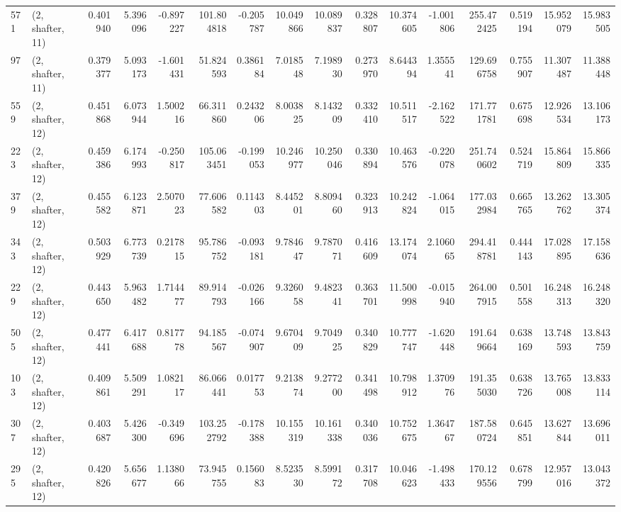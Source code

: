 \begin{tabular}{llrrrrrrrrrrrrrr}
571 &  (2, shafter, 11) &   0.401940 &   5.396096 &  -0.897227 &   101.804818 &  -0.205787 &  10.049866 &  10.089837 &  0.328807 &  10.374605 &  -1.001806 &    255.472425 &   0.519194 &   15.952079 &   15.983505 \\
97  &  (2, shafter, 11) &   0.379377 &   5.093173 &  -1.601431 &    51.824593 &   0.386184 &   7.018548 &   7.198930 &  0.273970 &   8.644394 &   1.355541 &    129.696758 &   0.755907 &   11.307487 &   11.388448 \\
559 &  (2, shafter, 12) &   0.451868 &   6.073944 &   1.500216 &    66.311860 &   0.243206 &   8.003825 &   8.143209 &  0.332410 &  10.511517 &  -2.162522 &    171.771781 &   0.675698 &   12.926534 &   13.106173 \\
223 &  (2, shafter, 12) &   0.459386 &   6.174993 &  -0.250817 &   105.063451 &  -0.199053 &  10.246977 &  10.250046 &  0.330894 &  10.463576 &  -0.220078 &    251.740602 &   0.524719 &   15.864809 &   15.866335 \\
379 &  (2, shafter, 12) &   0.455582 &   6.123871 &   2.507023 &    77.606582 &   0.114303 &   8.445201 &   8.809460 &  0.323913 &  10.242824 &  -1.064015 &    177.032984 &   0.665765 &   13.262762 &   13.305374 \\
343 &  (2, shafter, 12) &   0.503929 &   6.773739 &   0.217815 &    95.786752 &  -0.093181 &   9.784647 &   9.787071 &  0.416609 &  13.174074 &   2.106065 &    294.418781 &   0.444143 &   17.028895 &   17.158636 \\
229 &  (2, shafter, 12) &   0.443650 &   5.963482 &   1.714477 &    89.914793 &  -0.026166 &   9.326058 &   9.482341 &  0.363701 &  11.500998 &  -0.015940 &    264.007915 &   0.501558 &   16.248313 &   16.248320 \\
505 &  (2, shafter, 12) &   0.477441 &   6.417688 &   0.817778 &    94.185567 &  -0.074907 &   9.670409 &   9.704925 &  0.340829 &  10.777747 &  -1.620448 &    191.649664 &   0.638169 &   13.748593 &   13.843759 \\
103 &  (2, shafter, 12) &   0.409861 &   5.509291 &   1.082117 &    86.066441 &   0.017753 &   9.213874 &   9.277200 &  0.341498 &  10.798912 &   1.370976 &    191.355030 &   0.638726 &   13.765008 &   13.833114 \\
307 &  (2, shafter, 12) &   0.403687 &   5.426300 &  -0.349696 &   103.252792 &  -0.178388 &  10.155319 &  10.161338 &  0.340036 &  10.752675 &   1.364767 &    187.580724 &   0.645851 &   13.627844 &   13.696011 \\
295 &  (2, shafter, 12) &   0.420826 &   5.656677 &   1.138066 &    73.945755 &   0.156083 &   8.523530 &   8.599172 &  0.317708 &  10.046623 &  -1.498433 &    170.129556 &   0.678799 &   12.957016 &   13.043372 \\

\end{tabular}
